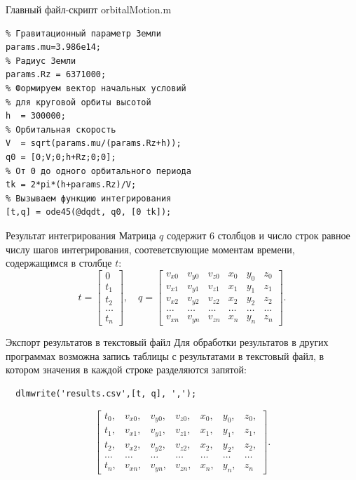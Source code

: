 \documentclass[11pt, compress]{beamer}
\begin{document}
\begin{frame}[fragile]{Главный файл-скрипт orbitalMotion.m}
\begin{lstlisting}
% Гравитационный параметр Земли
params.mu=3.986e14;
% Радиус Земли
params.Rz = 6371000;    
% Формируем вектор начальных условий  
% для круговой орбиты высотой
h  = 300000;
% Орбитальная скорость
V  = sqrt(params.mu/(params.Rz+h));  
q0 = [0;V;0;h+Rz;0;0];
% От 0 до одного орбитального периода
tk = 2*pi*(h+params.Rz)/V;
% Вызываем функцию интегрирования
[t,q] = ode45(@dqdt, q0, [0 tk]);  
\end{lstlisting}
\end{frame}

\begin{frame}[fragile]{Результат интегрирования}
Матрица $q$ содержит 6 столбцов и число строк равное числу шагов интегрирования, соотеветсвующие моментам времени, содержащимся в столбце $t$:
$$
  t = \begin{bmatrix} 0 \\ t_1 \\ t_2 \\ \ldots \\ t_n \end{bmatrix}, \quad
  q = 
\begin{bmatrix} 
  v_{x0} & v_{y0} & v_{z0} & x_{0} & y_{0} & z_{0} \\
  v_{x1} & v_{y1} & v_{z1} & x_{1} & y_{1} & z_{1} \\
  v_{x2} & v_{y2} & v_{z2} & x_{2} & y_{2} & z_{2} \\
  \ldots & \ldots & \ldots & \ldots & \ldots & \ldots \\
  v_{xn} & v_{yn} & v_{zn} & x_{n} & y_{n} & z_{n} 
\end{bmatrix}.
$$
\end{frame}

\begin{frame}[fragile]{Экспорт результатов в текстовый файл}
Для обработки результатов в других программах возможна запись таблицы с результатами в текстовый файл, в котором значения в каждой строке разделяются запятой:
\begin{lstlisting}  
  dlmwrite('results.csv',[t, q], ',');
\end{lstlisting}
$$
\begin{bmatrix} 
  t_0, & v_{x0}, & v_{y0}, & v_{z0}, & x_{0}, & y_{0}, & z_{0}, \\
  t_1, & v_{x1}, & v_{y1}, & v_{z1}, & x_{1}, & y_{1}, & z_{1}, \\
  t_2, & v_{x2}, & v_{y2}, & v_{z2}, & x_{2}, & y_{2}, & z_{2}, \\
  \ldots & \ldots & \ldots & \ldots & \ldots & \ldots & \ldots \\
  t_n, & v_{xn}, & v_{yn}, & v_{zn}, & x_{n}, & y_{n}, & z_{n} 
\end{bmatrix}.
$$
\end{frame}
\end{document}
